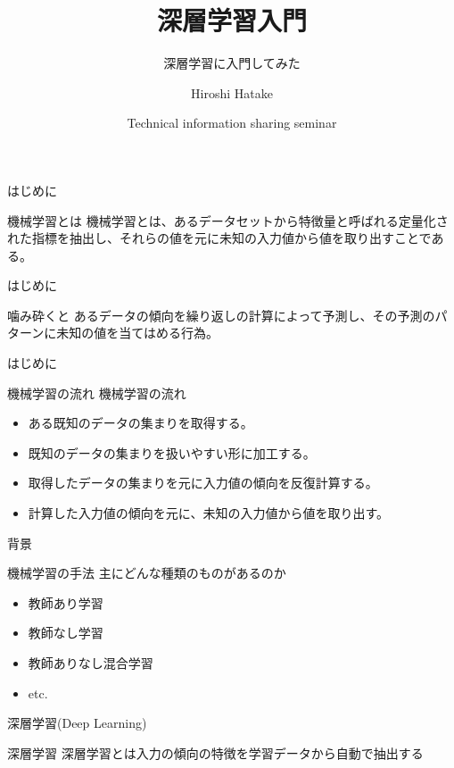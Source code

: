 \documentclass[12pt, unicode]{beamer}
\title{深層学習入門}
\subtitle{深層学習に入門してみた}
\author{Hiroshi Hatake}
\date[2016/07/08]{Technical information sharing seminar}
\begin{document}
\frame{\maketitle}

\begin{frame}{はじめに}
\begin{block}{機械学習とは}
機械学習とは、あるデータセットから特徴量と呼ばれる定量化された指標を抽出し、それらの値を元に未知の入力値から値を取り出すことである。
\end{block}
\end{frame}

\begin{frame}{はじめに}
\begin{block}{噛み砕くと}
あるデータの傾向を繰り返しの計算によって予測し、その予測のパターンに未知の値を当てはめる行為。
\end{block}
\end{frame}

\begin{frame}{はじめに}
\begin{block}{機械学習の流れ}
機械学習の流れ
\end{block}
\begin{itemize}
\item<2-> ある既知のデータの集まりを取得する。
\item<3-> 既知のデータの集まりを扱いやすい形に加工する。
\item<4-> 取得したデータの集まりを元に入力値の傾向を反復計算する。
\item<5-> 計算した入力値の傾向を元に、未知の入力値から値を取り出す。
\end{itemize}
\end{frame}

\begin{frame}{背景}
\begin{block}{機械学習の手法}
主にどんな種類のものがあるのか
\end{block}
\begin{itemize}
\item 教師あり学習
\item 教師なし学習
\item 教師ありなし混合学習
\item etc.
\end{itemize}
\end{frame}

\begin{frame}{深層学習(Deep Learning)}
\begin{block}{深層学習}
深層学習とは入力の傾向の特徴を学習データから自動で抽出する
\end{block}
\end{frame}
\end{document}
